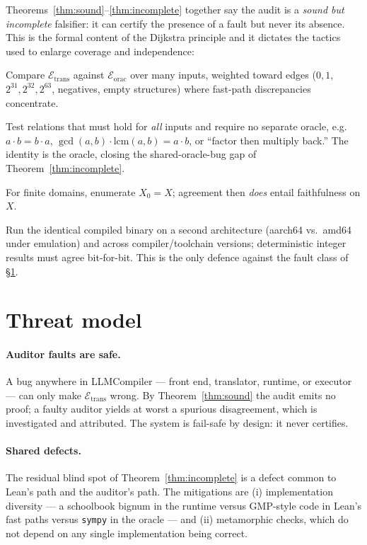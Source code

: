 \documentclass[11pt]{article}
\theoremstyle{definition}
\theoremstyle{plain}
\theoremstyle{remark}
\newcommand{\eval}{\mathcal{E}}
\begin{document}
Theorems~\ref{thm:sound}--\ref{thm:incomplete} together say the audit is a \emph{sound but incomplete}
falsifier: it can certify the presence of a fault but never its absence. This is the formal content of
the Dijkstra principle and it dictates the tactics used to enlarge coverage and independence:

\begin{description}[leftmargin=1.2em,itemsep=1pt]
\item[Differential.] Compare $\eval_{\mathrm{trans}}$ against $\eval_{\mathrm{orac}}$ over many inputs,
      weighted toward edges ($0,1$, $2^{31},2^{32},2^{63}$, negatives, empty structures) where fast-path
      discrepancies concentrate.
\item[Metamorphic.] Test relations that must hold for \emph{all} inputs and require no separate oracle,
      e.g.\ $a\cdot b = b\cdot a$, $\gcd(a,b)\cdot\mathrm{lcm}(a,b)=a\cdot b$, or ``factor then multiply
      back.'' The identity is the oracle, closing the shared-oracle-bug gap of Theorem~\ref{thm:incomplete}.
\item[Bounded-exhaustive.] For finite domains, enumerate $X_0=X$; agreement then \emph{does} entail
      faithfulness on $X$.
\item[Redundant execution.] Run the identical compiled binary on a second architecture (aarch64 vs.\
      amd64 under emulation) and across compiler/toolchain versions; deterministic integer results must
      agree bit-for-bit. This is the only defence against the fault class of \S\ref{sec:threat}.
\end{description}

\section{Threat model}\label{sec:threat}

\paragraph{Auditor faults are safe.} A bug anywhere in LLMCompiler --- front end, translator, runtime,
or executor --- can only make $\eval_{\mathrm{trans}}$ wrong. By Theorem~\ref{thm:sound} the audit
emits no proof; a faulty auditor yields at worst a spurious disagreement, which is investigated and
attributed. The system is fail-safe by design: it never certifies.

\paragraph{Shared defects.} The residual blind spot of Theorem~\ref{thm:incomplete} is a defect common
to Lean's path and the auditor's path. The mitigations are (i) implementation diversity --- a
schoolbook bignum in the runtime versus GMP-style code in Lean's fast paths versus \texttt{sympy} in
the oracle --- and (ii) metamorphic checks, which do not depend on any single implementation being
correct.
\end{document}
